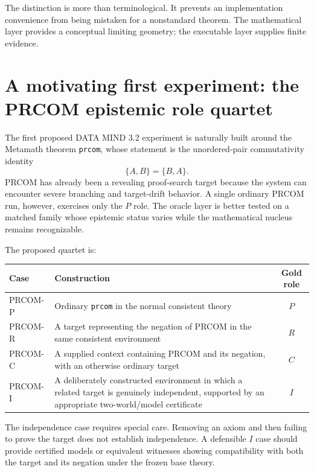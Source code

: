 \documentclass[11pt]{article}
\begin{document}
The distinction is more than terminological. It prevents an implementation convenience from being mistaken for a nonstandard theorem. The mathematical layer provides a conceptual limiting geometry; the executable layer supplies finite evidence.

\section{A motivating first experiment: the PRCOM epistemic role quartet}

The first proposed DATA MIND 3.2 experiment is naturally built around the Metamath theorem \texttt{prcom}, whose statement is the unordered-pair commutativity identity
\begin{equation}
\{A,B\}=\{B,A\}.
\end{equation}
PRCOM has already been a revealing proof-search target because the system can encounter severe branching and target-drift behavior. A single ordinary PRCOM run, however, exercises only the $P$ role. The oracle layer is better tested on a matched family whose epistemic status varies while the mathematical nucleus remains recognizable.

The proposed quartet is:
\begin{center}
\begin{tabular}{p{}p{}c}
\toprule
Case & Construction & Gold role\\
\midrule
PRCOM-P & Ordinary \texttt{prcom} in the normal consistent theory & $P$\\
PRCOM-R & A target representing the negation of PRCOM in the same consistent environment & $R$\\
PRCOM-C & A supplied context containing PRCOM and its negation, with an otherwise ordinary target & $C$\\
PRCOM-I & A deliberately constructed environment in which a related target is genuinely independent, supported by an appropriate two-world/model certificate & $I$\\
\bottomrule
\end{tabular}
\end{center}

The independence case requires special care. Removing an axiom and then failing to prove the target does not establish independence. A defensible $I$ case should provide certified models or equivalent witnesses showing compatibility with both the target and its negation under the frozen base theory.
\end{document}
